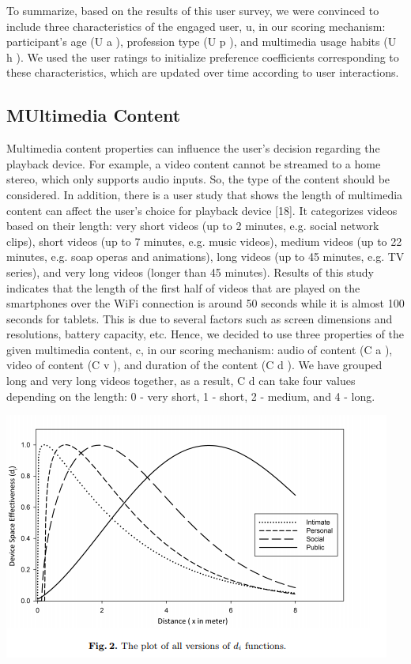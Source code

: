 \documentclass[runningheads,a4paper]{llncs}
\begin{document}
To summarize, based on the results of this user survey, we were convinced to
include three characteristics of the engaged user, u, in our scoring mechanism:
participant’s age (U
a
), profession type (U
p
), and multimedia usage habits (U
h
).
We used the user ratings to initialize preference coefficients corresponding to
these characteristics, which are updated over time according to user interactions.



\subsection{MUltimedia Content}

Multimedia content properties can influence the user’s decision regarding the
playback device. For example, a video content cannot be streamed to a home
stereo, which only supports audio inputs. So, the type of the content should be
considered. In addition, there is a user study that shows the length of multimedia
content can affect the user’s choice for playback device [18]. It categorizes videos
based on their length: very short videos (up to 2 minutes, e.g. social network
clips), short videos (up to 7 minutes, e.g. music videos), medium videos (up to
22 minutes, e.g. soap operas and animations), long videos (up to 45 minutes,
e.g. TV series), and very long videos (longer than 45 minutes). Results of this
study indicates that the length of the first half of videos that are played on the
smartphones over the WiFi connection is around 50 seconds while it is almost
100 seconds for tablets. This is due to several factors such as screen dimensions
and resolutions, battery capacity, etc. Hence, we decided to use three properties
of the given multimedia content, c, in our scoring mechanism: audio of content
(C
a
), video of content (C
v
), and duration of the content (C
d
). We have grouped
long and very long videos together, as a result, C
d
can take four values depending
on the length: 0 - very short, 1 - short, 2 - medium, and 4 - long.

\includegraphics{fig2.png}
\end{document}
